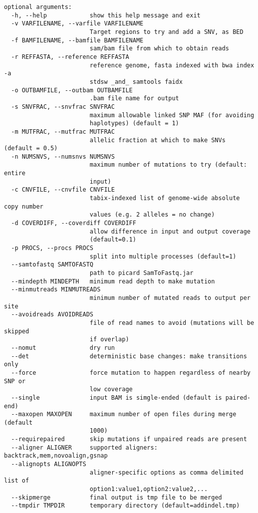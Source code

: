 \documentclass[letterpaper,11pt]{article}
\begin{document}
\begin{verbatim}
optional arguments:
  -h, --help            show this help message and exit
  -v VARFILENAME, --varfile VARFILENAME
                        Target regions to try and add a SNV, as BED
  -f BAMFILENAME, --bamfile BAMFILENAME
                        sam/bam file from which to obtain reads
  -r REFFASTA, --reference REFFASTA
                        reference genome, fasta indexed with bwa index -a
                        stdsw _and_ samtools faidx
  -o OUTBAMFILE, --outbam OUTBAMFILE
                        .bam file name for output
  -s SNVFRAC, --snvfrac SNVFRAC
                        maximum allowable linked SNP MAF (for avoiding
                        haplotypes) (default = 1)
  -m MUTFRAC, --mutfrac MUTFRAC
                        allelic fraction at which to make SNVs (default = 0.5)
  -n NUMSNVS, --numsnvs NUMSNVS
                        maximum number of mutations to try (default: entire
                        input)
  -c CNVFILE, --cnvfile CNVFILE
                        tabix-indexed list of genome-wide absolute copy number
                        values (e.g. 2 alleles = no change)
  -d COVERDIFF, --coverdiff COVERDIFF
                        allow difference in input and output coverage
                        (default=0.1)
  -p PROCS, --procs PROCS
                        split into multiple processes (default=1)
  --samtofastq SAMTOFASTQ
                        path to picard SamToFastq.jar
  --mindepth MINDEPTH   minimum read depth to make mutation
  --minmutreads MINMUTREADS
                        minimum number of mutated reads to output per site
  --avoidreads AVOIDREADS
                        file of read names to avoid (mutations will be skipped
                        if overlap)
  --nomut               dry run
  --det                 deterministic base changes: make transitions only
  --force               force mutation to happen regardless of nearby SNP or
                        low coverage
  --single              input BAM is simgle-ended (default is paired-end)
  --maxopen MAXOPEN     maximum number of open files during merge (default
                        1000)
  --requirepaired       skip mutations if unpaired reads are present
  --aligner ALIGNER     supported aligners: backtrack,mem,novoalign,gsnap
  --alignopts ALIGNOPTS
                        aligner-specific options as comma delimited list of
                        option1:value1,option2:value2,...
  --skipmerge           final output is tmp file to be merged
  --tmpdir TMPDIR       temporary directory (default=addindel.tmp)
\end{verbatim}
\end{document}
